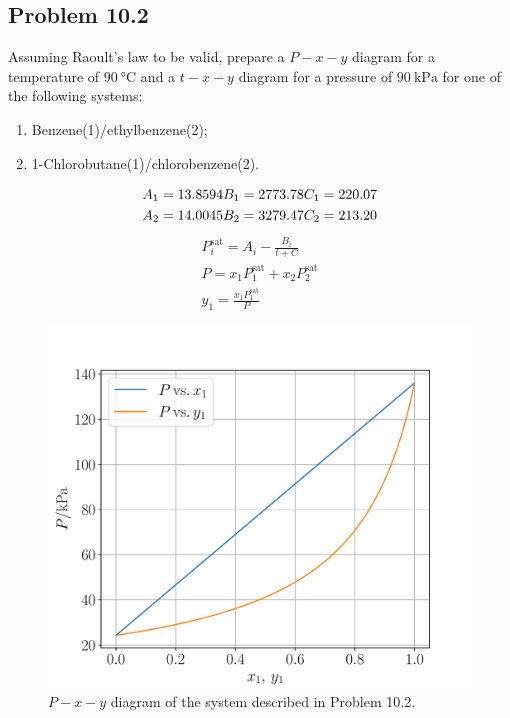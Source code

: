 \documentclass{article}
\begin{document}
\subsection*{Problem 10.2}
Assuming Raoult's law to be valid, prepare a $P-x-y$ diagram for a
temperature of $90~\unit{\degreeCelsius}$ and a $t-x-y$ diagram for a
pressure of $90~\unit{\kilo\pascal}$ for one of the following systems:
\begin{enumerate}[label=(\alph*)]
  \item Benzene(1)/ethylbenzene(2);
  \item 1-Chlorobutane(1)/chlorobenzene(2).
\end{enumerate}
\begin{solution}
  \begin{gather*}
    A_{1} = 13.8594 \hfill B_{1} = 2773.78 \hfill C_{1} = 220.07 \\
    A_{2} = 14.0045 \hfill B_{2} = 3279.47 \hfill C_{2} = 213.20 \\
  \end{gather*}
  \begin{gather*}
    P_{i}^{\text{sat}} = A_{i} - \frac{B_{i}}{t + C} \\
    P = x_{1}P_{1}^{\text{sat}} + x_{2}P_{2}^{\text{sat}} \\
    y_{1} = \frac{x_{1}P_{1}^{\text{sat}}}{P}
  \end{gather*}
  \begin{figure}[h!]
    \centering
    \begin{minipage}[t]{0.45\textwidth}
      \centering
      \includegraphics[scale=0.5]{images/problem_10_2a.pdf}
      \caption{$P-x-y$ diagram of the system described in Problem 10.2.}
      \label{fig:p10_2}
    \end{minipage}
    \hfill
  \end{figure}
\end{solution}
\end{document}
